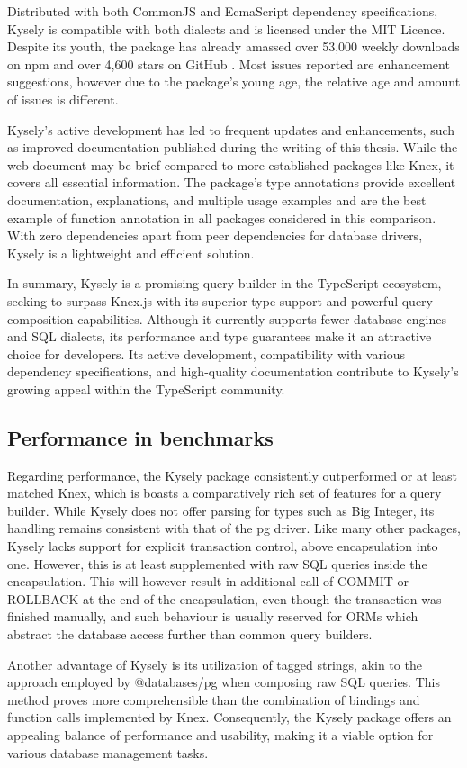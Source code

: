 Distributed with both CommonJS and EcmaScript dependency specifications, Kysely
is compatible with both dialects and is licensed under the MIT Licence. Despite
its youth, the package has already amassed over 53,000 weekly downloads on npm
and over 4,600 stars on GitHub \cite{kyselyGithub}. Most issues reported are
enhancement suggestions, however due to the package's young age, the relative
age and amount of issues is different.

Kysely's active development has led to frequent updates and enhancements, such
as improved documentation published during the writing of this thesis. While the
web document may be brief compared to more established packages like Knex, it
covers all essential information. The package's type annotations provide
excellent documentation, explanations, and multiple usage examples and are the
best example of function annotation in all packages considered in this
comparison. With zero dependencies apart from peer dependencies for database
drivers, Kysely is a lightweight and efficient solution.

In summary, Kysely is a promising query builder in the TypeScript ecosystem,
seeking to surpass Knex.js with its superior type support and powerful query
composition capabilities. Although it currently supports fewer database engines
and SQL dialects, its performance and type guarantees make it an attractive
choice for developers. Its active development, compatibility with various
dependency specifications, and high-quality documentation contribute to Kysely's
growing appeal within the TypeScript community.

\subsection*{Performance in benchmarks}

Regarding performance, the Kysely package consistently outperformed or at least
matched Knex, which is boasts a comparatively rich set of features for a query
builder. While Kysely does not offer parsing for types such as Big Integer, its
handling remains consistent with that of the pg driver. Like many other
packages, Kysely lacks support for explicit transaction control, above
encapsulation into one. However, this is at least supplemented with raw SQL
queries inside the encapsulation. This will however result in additional call of
COMMIT or ROLLBACK at the end of the encapsulation, even though the transaction
was finished manually, and such behaviour is usually reserved for ORMs which
abstract the database access further than common query builders.

Another advantage of Kysely is its utilization of tagged strings, akin to the
approach employed by @databases/pg when composing raw SQL queries. This method
proves more comprehensible than the combination of bindings and function calls
implemented by Knex. Consequently, the Kysely package offers an appealing
balance of performance and usability, making it a viable option for various
database management tasks.
